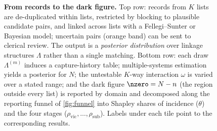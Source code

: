\begin{figure}[t]
\caption{\textbf{From records to the dark figure.} Top row: records from
$K$ lists are de-duplicated within lists, restricted by blocking to plausible
candidate pairs, and linked across lists with a Fellegi--Sunter or Bayesian
model; uncertain pairs (orange band) can be sent to clerical review. The
output is a \emph{posterior distribution} over linkage structures $\Lambda$
rather than a single matching. Bottom row: each draw $\Lambda^{(m)}$ induces a
capture-history table; multiple-systems estimation yields a posterior for
$N$; the untestable $K$-way interaction $\omega$ is varied over a stated range;
and the dark figure $\nzero=N-n$ (the region outside every list) is reported
by domain and decomposed along the reporting funnel of \cref{fig:funnel} into
Shapley shares of incidence ($\theta$) and the four stages ($\rho_{\mathrm{vic}},\dots,\rho_{\mathrm{sub}}$).
Labels under each tile point to the corresponding results.}
\label{fig:pipeline}
\end{figure}
